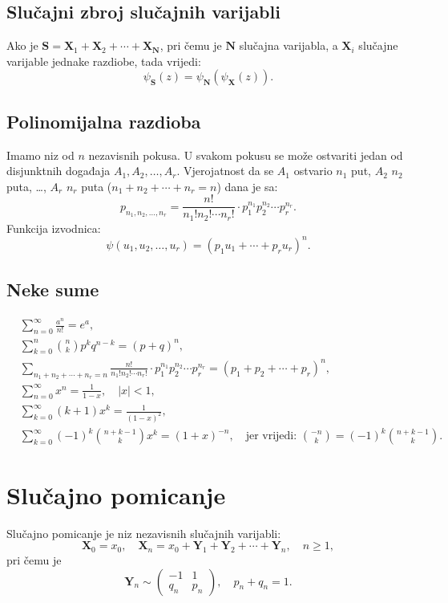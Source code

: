 \documentclass[12pt,english]{article}
\begin{document}
\subsection{Slučajni zbroj slučajnih varijabli}
Ako je $\mathbf S = \mathbf X_1 + \mathbf X_2 + \cdots + \mathbf X_{\mathbf N}$, pri čemu je $\mathbf N$ slučajna varijabla, a $\mathbf X_i$ slučajne varijable jednake razdiobe, tada vrijedi:
$$\psi_{\mathbf S}(z) = \psi_{\mathbf N}(\psi_{\mathbf X}(z)).$$

\subsection{Polinomijalna razdioba}
Imamo niz od $n$ nezavisnih pokusa. U svakom pokusu se može ostvariti jedan od disjunktnih događaja $A_1, A_2, \ldots, A_r$. Vjerojatnost da se $A_1$ ostvario $n_1$ put, $A_2$ $n_2$ puta, \ldots, $A_r$ $n_r$ puta ($n_1+n_2+\cdots+n_r=n$) dana je sa:
$$p_{n_1,n_2,\ldots,n_r}=\frac{n!}{n_1!n_2!\cdots n_r!} \cdot p_1^{n_1} p_2^{n_2} \cdots p_r^{n_r}.$$
Funkcija izvodnica:
$$\psi(u_1,u_2,\ldots,u_r) = (p_1u_1+\cdots+p_ru_r)^n.$$

\subsection{Neke sume}
\begin{align*}
  &\sum_{n=0}^\infty \frac{a^n}{n!}  = e^a, \\
  &\sum_{k=0}^n {n \choose k } p^k q^{n-k} = (p+q)^n,\\
  &\sum_{n_1+n_2+\cdots+n_r=n} \frac{n!}{n_1!n_2!\cdots n_r!} \cdot p_1^{n_1}p_2^{n_2}\cdots p_r^{n_r} = (p_1+p_2+\cdots+p_r)^n,\\
  &\sum_{n=0}^\infty x^n = \frac{1}{1-x}, \quad |x| < 1,\\
  &\sum_{k=0}^\infty (k+1)x^k = \frac{1}{(1-x)^2},\\
  &\sum_{k=0}^\infty (-1)^k {n+k-1 \choose k } x^k = (1+x)^{-n}, \quad \text{jer vrijedi: }
  {-n \choose k} = (-1)^k{n+k-1 \choose k}.
\end{align*}

\section{Slučajno pomicanje}
Slučajno pomicanje je niz nezavisnih slučajnih varijabli:
$$\mathbf X_0 = x_0, \quad \mathbf X_n = x_0 + \mathbf Y_1 + \mathbf Y_2 +\cdots + \mathbf Y_n, \quad n \geq 1,$$
pri čemu je
$$\mathbf Y_n \sim \left( \begin{array}{lr}
-1 & 1\\
q_n & p_n
\end{array} \right),
\quad p_n+q_n = 1.$$
\end{document}
